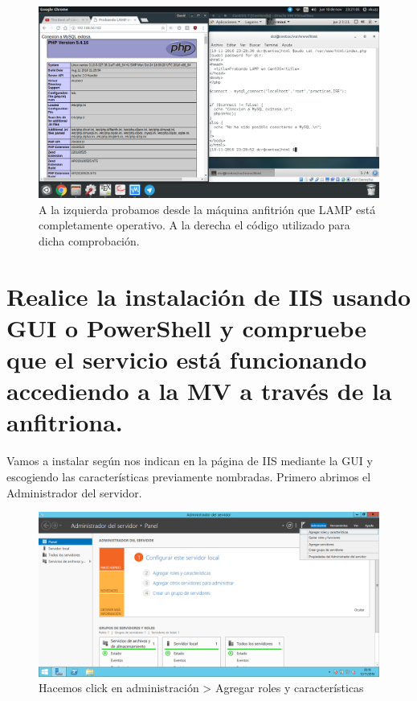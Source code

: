\begin{flushleft}
\begin{figure}[H]
	\centering
	\includegraphics[scale=0.3]{lampTest.png}
	\caption{A la izquierda probamos desde la máquina anfitrión que LAMP está completamente operativo. A la derecha el código utilizado para dicha comprobación.}
\end{figure}





\section{Realice la instalación de IIS usando GUI o PowerShell y compruebe que el servicio está funcionando accediendo a la MV a través de la anfitriona.}
Vamos a instalar según nos indican en la página de IIS \cite{c10} mediante la GUI y escogiendo las características previamente nombradas. Primero abrimos el Administrador del servidor.

\begin{figure}[H]
	\centering
	\includegraphics[scale=0.4]{iis1.png}
	\caption{Hacemos click en administración > Agregar roles y características}
\end{figure}


\end{flushleft}
